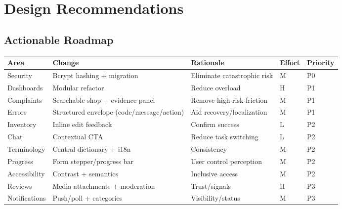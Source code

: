 \documentclass[11pt,a4paper]{article}
\begin{document}
\section{Design Recommendations}
\subsection{Actionable Roadmap}
\begin{longtable}{p{2.2cm}p{5.2cm}p{4.2cm}p{1.2cm}p{1.2cm}}
\toprule
Area & Change & Rationale & Effort & Priority \\
\midrule
Security & Bcrypt hashing + migration & Eliminate catastrophic risk & M & P0 \\
Dashboards & Modular refactor & Reduce overload & H & P1 \\
Complaints & Searchable shop + evidence panel & Remove high-risk friction & M & P1 \\
Errors & Structured envelope (code/message/action) & Aid recovery/localization & M & P1 \\
Inventory & Inline edit feedback & Confirm success & L & P2 \\
Chat & Contextual CTA & Reduce task switching & L & P2 \\
Terminology & Central dictionary + i18n & Consistency & M & P2 \\
Progress & Form stepper/progress bar & User control perception & M & P2 \\
Accessibility & Contrast + semantics & Inclusive access & M & P2 \\
Reviews & Media attachments + moderation & Trust/signals & H & P3 \\
Notifications & Push/poll + categories & Visibility/status & M & P3 \\
\bottomrule
\end{longtable}
\end{document}

